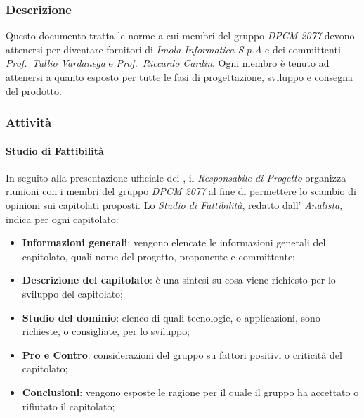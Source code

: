 		\subsubsection{Descrizione}
		Questo documento tratta le norme a cui membri del gruppo \textit{DPCM 2077} devono attenersi per diventare fornitori di \textit{Imola Informatica S.p.A} e dei committenti \textit{Prof.~Tullio Vardanega} e \textit{Prof.~Riccardo Cardin}. Ogni membro è tenuto ad attenersi a quanto esposto per tutte le fasi di progettazione, sviluppo e consegna del prodotto.
		\subsubsection{Attività}
			\paragraph{Studio di Fattibilità}
			In seguito alla presentazione ufficiale dei , il \textit{Responsabile di Progetto} organizza riunioni con i membri del gruppo \textit{DPCM 2077} al fine di permettere lo scambio di opinioni sui capitolati proposti. Lo \textit{Studio di Fattibilità}, redatto dall' \textit{Analista}, indica per ogni capitolato:
			\begin{itemize}
				\item \textbf{Informazioni generali}: vengono elencate le informazioni generali del capitolato, quali nome del progetto, proponente e committente;
				\item \textbf{Descrizione del capitolato}: è una sintesi su cosa viene richiesto per lo sviluppo del capitolato;
				\item \textbf{Studio del dominio}: elenco di quali tecnologie, o applicazioni, sono richieste, o consigliate, per lo sviluppo;
				\item \textbf{Pro e Contro}: considerazioni del gruppo su fattori positivi o criticità del capitolato;
				\item \textbf{Conclusioni}: vengono esposte le ragione per il quale il gruppo ha accettato o rifiutato il capitolato;
			\end{itemize}
